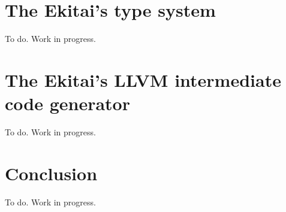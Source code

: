 \documentclass[
  oneside,
  english,
  coorientadorbanca,
  noabntexcite
]{ufsc-thesis-rn46-2019}
\begin{document}
\section{The Ekitai's type system}

To do. Work in progress.

\section{The Ekitai's LLVM intermediate code generator}

To do. Work in progress.

\section{Conclusion}

To do. Work in progress.


\postextual{}

\printbibliography{}
\end{document}
